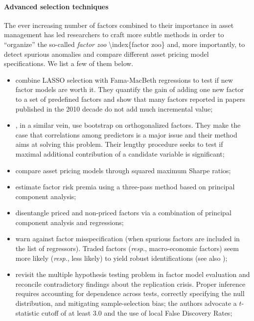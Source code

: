 \paragraph{Advanced selection techniques}

The ever increasing number of factors combined to their importance in asset management has led researchers to craft more subtle methods in order to ``organize'' the so-called \textit{factor zoo} {\textbackslash}index\{factor zoo\} and, more importantly, to detect spurious anomalies and compare different asset pricing model specifications. We list a few of them below.

\begin{itemize}
\item \cite{feng2019taming} combine LASSO selection with Fama-MacBeth regressions to test if new factor models are worth it. They quantify the gain of adding one new factor to a set of predefined factors and show that many factors reported in papers published in the 2010 decade do not add much incremental value;
\item \cite{harvey2017lucky}, in a similar vein, use bootstrap on orthogonalized factors. They make the case that correlations among predictors is a major issue and their method aims at solving this problem. Their lengthy procedure seeks to test if maximal additional contribution of a candidate variable is significant;
\item \cite{fama2018choosing} compare asset pricing models through squared maximum Sharpe ratios;
\item \cite{giglio2018asset} estimate factor risk premia using a three-pass method based on principal component analysis;
\item \cite{pukthuanthong2018protocol} disentangle priced and non-priced factors via a combination of principal component analysis and \cite{fama1973risk} regressions;
\item \cite{gospodinov2019too} warn against factor misspecification (when spurious factors are included in the list of regressors). Traded factors (\textit{resp}., macro-economic factors) seem more likely (\textit{resp}., less likely) to yield robust identifications (see also \cite{bryzgalova2019spurious});
\item \cite{harvey2026threshold} revisit the multiple hypothesis testing problem in factor model evaluation and reconcile contradictory findings about the replication crisis. Proper inference requires accounting for dependence across tests, correctly specifying the null distribution, and mitigating sample-selection bias; the authors advocate a $t$-statistic cutoff of at least 3.0 and the use of local False Discovery Rates;

\end{itemize}
